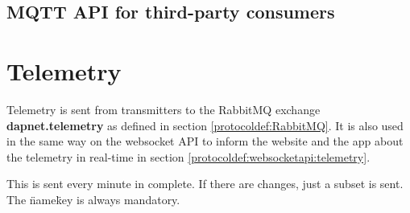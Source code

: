 \subsection{MQTT API for third-party consumers}


\section{Telemetry}
\label{protocoldef:telemetry}
Telemetry is sent from transmitters to the RabbitMQ exchange \textbf{dapnet.telemetry} as defined in section \ref{protocoldef:RabbitMQ}. It is also used in the same way on the websocket API to inform the website and the app about the telemetry in real-time in section \ref{protocoldef:websocketapi:telemetry}.

This is sent every minute in complete. If there are changes, just a subset is sent. The \"name\" key is always mandatory.
